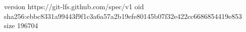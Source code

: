 version https://git-lfs.github.com/spec/v1
oid sha256:ebbc8331a99443f9f1c3a6a57a2b19efe80145b07f32e422cc6686854419e853
size 196704
